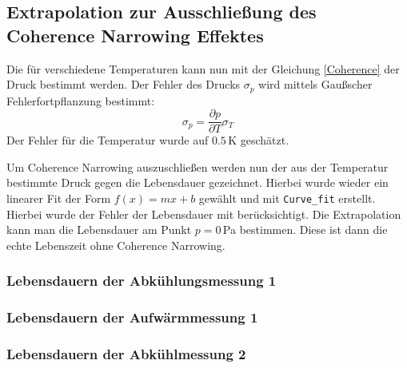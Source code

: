 \subsection{Extrapolation zur Ausschließung des Coherence Narrowing Effektes}
Die für verschiedene Temperaturen kann nun mit der Gleichung \ref{Coherence} der Druck bestimmt werden. Der Fehler des Drucks $\sigma_p$ wird mittels Gaußscher Fehlerfortpflanzung bestimmt:
\begin{equation}
\sigma_p = \frac{\partial p}{\partial T} \sigma_T
\end{equation}
Der Fehler für die Temperatur wurde auf $0.5\,$K geschätzt.\par
Um Coherence Narrowing auszuschließen werden nun der aus der Temperatur bestimmte Druck gegen die Lebensdauer gezeichnet. Hierbei wurde wieder ein linearer Fit der Form $f(x)=mx+b$ gewählt und mit \verb|Curve_fit| erstellt. Hierbei wurde der Fehler der Lebensdauer mit berücksichtigt. Die Extrapolation kann man die Lebensdauer am Punkt $p=0\,$Pa bestimmen. Diese ist dann die echte Lebenszeit ohne Coherence Narrowing. 
\subsubsection{Lebensdauern der Abkühlungsmessung 1}
\subsubsection{Lebensdauern der Aufwärmmessung 1}
\subsubsection{Lebensdauern der Abkühlmessung 2}